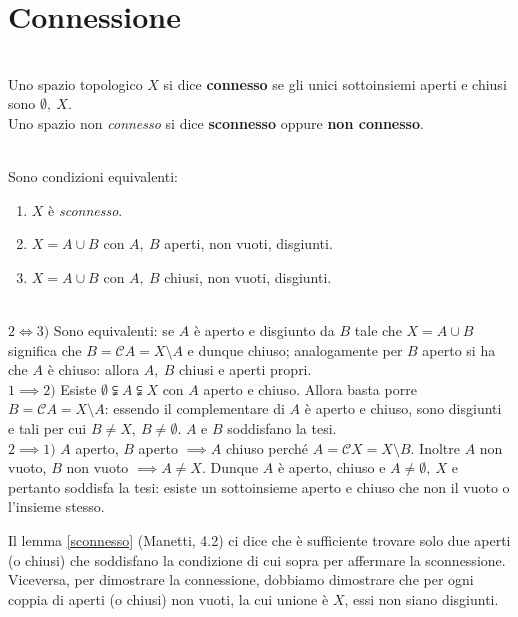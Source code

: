 \section{Connessione}
\begin{define}~{}\\
Uno spazio topologico $X$ si dice \textbf{connesso} se gli unici sottoinsiemi aperti e chiusi sono $\emptyset,\ X$.\\
Uno spazio non \textit{connesso} si dice \textbf{sconnesso} oppure \textbf{non connesso}.
\end{define}
\begin{lemming}~{}\label{sconnesso}\\
Sono condizioni equivalenti:
\begin{enumerate}
	\item $X$ è \textit{sconnesso}.
	\item $X=A\cup B$ con $A,\ B$ aperti, non vuoti, disgiunti.
	\item $X=A\cup B$ con $A,\ B$ chiusi, non vuoti, disgiunti.
\end{enumerate}
\vspace{-3mm}
\end{lemming}
\begin{demonstration}~{}\\
$2\iff3)$ Sono equivalenti: se $A$ è aperto e disgiunto da $B$ tale che $X=A\cup B$ significa che $B=\mathcal{C}A=X\setminus A$ e dunque chiuso; analogamente per $B$ aperto si ha che $A$ è chiuso: allora $A,\ B$ chiusi e aperti propri.\\
$1\implies2)$ Esiste $\emptyset\subsetneqq A \subsetneqq X$ con $A$ aperto e chiuso. Allora basta porre $B=\mathcal{C}A=X\setminus A$: essendo il complementare di $A$ è aperto e chiuso, sono disgiunti e tali per cui $B\neq X,\ B\neq \emptyset$. $A$ e $B$ soddisfano la tesi.\\
$2\implies1)$ $A$ aperto, $B$ aperto $\implies A$ chiuso perché $A=\mathcal{C}X=X\setminus B$. Inoltre $A$ non vuoto, $B$ non vuoto $\implies A\neq X$. Dunque $A$ è aperto, chiuso e $A\neq \emptyset,\ X$ e pertanto soddisfa la tesi: esiste un sottoinsieme aperto e chiuso che non il vuoto o l'insieme stesso.
\end{demonstration}
\begin{tips}
	Il lemma \ref{sconnesso} (Manetti, 4.2) ci dice che è sufficiente trovare solo due aperti (o chiusi) che soddisfano la condizione di cui sopra per affermare la sconnessione. Viceversa, per dimostrare la connessione, dobbiamo dimostrare che per ogni coppia di aperti (o chiusi) non vuoti, la cui unione è $X$, essi non siano disgiunti.
\end{tips}
